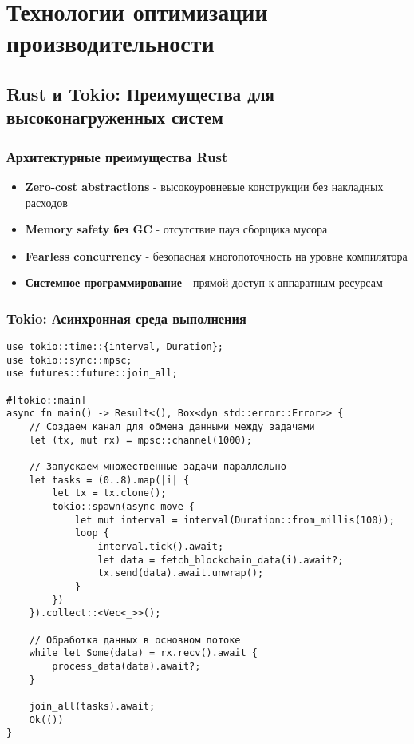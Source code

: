 \documentclass[11pt,a4paper]{article}
\begin{document}
\section{Технологии оптимизации производительности}

\subsection{Rust и Tokio: Преимущества для высоконагруженных систем}

\subsubsection{Архитектурные преимущества Rust}

\begin{itemize}
    \item \textbf{Zero-cost abstractions} - высокоуровневые конструкции без накладных расходов
    \item \textbf{Memory safety без GC} - отсутствие пауз сборщика мусора
    \item \textbf{Fearless concurrency} - безопасная многопоточность на уровне компилятора
    \item \textbf{Системное программирование} - прямой доступ к аппаратным ресурсам
\end{itemize}

\subsubsection{Tokio: Асинхронная среда выполнения}

\begin{lstlisting}[style=rustcode, caption=Пример высокопроизводительного кода с Tokio]
use tokio::time::{interval, Duration};
use tokio::sync::mpsc;
use futures::future::join_all;

#[tokio::main]
async fn main() -> Result<(), Box<dyn std::error::Error>> {
    // Создаем канал для обмена данными между задачами
    let (tx, mut rx) = mpsc::channel(1000);
    
    // Запускаем множественные задачи параллельно
    let tasks = (0..8).map(|i| {
        let tx = tx.clone();
        tokio::spawn(async move {
            let mut interval = interval(Duration::from_millis(100));
            loop {
                interval.tick().await;
                let data = fetch_blockchain_data(i).await?;
                tx.send(data).await.unwrap();
            }
        })
    }).collect::<Vec<_>>();
    
    // Обработка данных в основном потоке
    while let Some(data) = rx.recv().await {
        process_data(data).await?;
    }
    
    join_all(tasks).await;
    Ok(())
}
\end{lstlisting}
\end{document}
